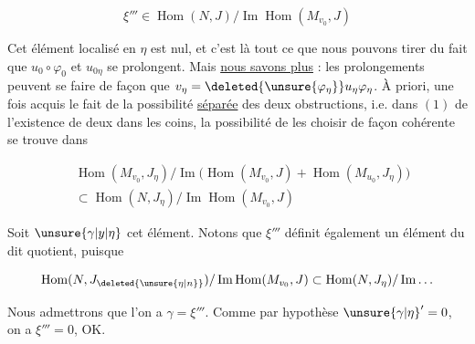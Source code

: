 \[
\xi'''\in\operatorname{Hom}(N,J)/\operatorname{Im}\operatorname{Hom}(M_{v_0},J)
\]

 Cet élément localisé en $\eta$ est nul,  et c'est là tout ce que nous pouvons tirer du fait que $u_0\circ\varphi_0$ et $u_{0\eta}$ se prolongent. Mais \uline{nous savons plus} : les prolongements  peuvent se faire de façon que $v_\eta=\deleted{\unsure{\varphi_\eta}}u_\eta\varphi_\eta$. À priori,  une fois acquis le fait de la possibilité \uline{séparée} des deux obstructions, i.e. dans $(1)$ de l'existence de deux  dans les coins, la  possibilité de les choisir de façon cohérente se trouve dans

\[
\begin{aligned}
&\operatorname{Hom}(M_{v_0},J_\eta)/\operatorname{Im}\big(\operatorname{Hom}(M_{v_0},J)+\operatorname{Hom}(M_{u_0},J_\eta)\big)\\
&\subset\operatorname{Hom}(N,J_\eta)/\operatorname{Im}\operatorname{Hom}(M_{v_0},J)
\end{aligned}
\]

Soit $\unsure{\gamma|y|\eta}$ cet élément. Notons que $\xi'''$ définit également un élément du dit quotient, puisque

\[
\operatorname{Hom}(N,J_{\deleted{\unsure{\eta|n}}})/\operatorname{Im}\operatorname{Hom}(M_{v_0},J)\subset\operatorname{Hom}(N,J_\eta)/\operatorname{Im}\ldots
\]

Nous admettrons que l'on a $\gamma=\xi'''$. Comme par hypothèse $\unsure{\gamma|\eta}'=0$, on a $\xi'''=0$, OK.

